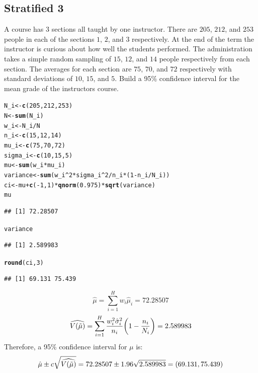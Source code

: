 \documentclass[oneside]{book}\usepackage[]{graphicx}\usepackage[dvipsnames,table,xcdraw]{xcolor}
\makeatletter
\newcommand{\hlnum}[1]{\textcolor[rgb]{0.686,0.059,0.569}{#1}}%
\newcommand{\hlopt}[1]{\textcolor[rgb]{0,0,0}{#1}}%
\newcommand{\hlstd}[1]{\textcolor[rgb]{0.345,0.345,0.345}{#1}}%
\newcommand{\hlkwb}[1]{\textcolor[rgb]{0.69,0.353,0.396}{#1}}%
\newcommand{\hlkwd}[1]{\textcolor[rgb]{0.737,0.353,0.396}{\textbf{#1}}}%
\newenvironment{kframe}{%
 \def\at@end@of@kframe{}%
 \ifinner\ifhmode%
  \def\at@end@of@kframe{\end{minipage}}%
  \begin{minipage}{\columnwidth}%
 \fi\fi%
 \def\FrameCommand##1{\hskip\@totalleftmargin \hskip-\fboxsep
 \colorbox{shadecolor}{##1}\hskip-\fboxsep
     \hskip-\linewidth \hskip-\@totalleftmargin \hskip\columnwidth}%
 \MakeFramed {\advance\hsize-\width
   \@totalleftmargin\z@ \linewidth\hsize
   \@setminipage}}%
 {\par\unskip\endMakeFramed%
 \at@end@of@kframe}
\newenvironment{knitrout}{}{} %
\let\mathbb\relax
\makeatother
\begin{document}
\subsection{Stratified 3}
A course has 3 sections all taught by one instructor. There
are $205$, $212$, and $253$ people in each of the sections
$1$, $2$, and $3$ respectively. At the end of the term the instructor
is curious about how well the students performed. The administration
takes a simple random sampling of $15$, $12$, and $14$ people respectively from each section.
The averages for each section are $75$, $70$, and $72$ respectively
with standard deviations of $10$, $15$, and $5$. Build a 95\%
confidence interval for the mean grade of the instructors course.

\begin{knitrout}
\color{fgcolor}\begin{kframe}
\begin{alltt}
\hlstd{N_i} \hlkwb{<-} \hlkwd{c}\hlstd{(}\hlnum{205}\hlstd{,} \hlnum{212}\hlstd{,} \hlnum{253}\hlstd{)}
\hlstd{N} \hlkwb{<-} \hlkwd{sum}\hlstd{(N_i)}
\hlstd{w_i} \hlkwb{<-} \hlstd{N_i}\hlopt{/}\hlstd{N}
\hlstd{n_i} \hlkwb{<-} \hlkwd{c}\hlstd{(}\hlnum{15}\hlstd{,} \hlnum{12}\hlstd{,} \hlnum{14}\hlstd{)}
\hlstd{mu_i} \hlkwb{<-} \hlkwd{c}\hlstd{(}\hlnum{75}\hlstd{,} \hlnum{70}\hlstd{,} \hlnum{72}\hlstd{)}
\hlstd{sigma_i} \hlkwb{<-} \hlkwd{c}\hlstd{(}\hlnum{10}\hlstd{,} \hlnum{15}\hlstd{,} \hlnum{5}\hlstd{)}
\hlstd{mu} \hlkwb{<-} \hlkwd{sum}\hlstd{(w_i} \hlopt{*} \hlstd{mu_i)}
\hlstd{variance} \hlkwb{<-} \hlkwd{sum}\hlstd{(w_i}\hlopt{^}\hlnum{2} \hlopt{*} \hlstd{sigma_i}\hlopt{^}\hlnum{2}\hlopt{/}\hlstd{n_i} \hlopt{*} \hlstd{(}\hlnum{1} \hlopt{-} \hlstd{n_i}\hlopt{/}\hlstd{N_i))}
\hlstd{ci} \hlkwb{<-} \hlstd{mu} \hlopt{+} \hlkwd{c}\hlstd{(}\hlopt{-}\hlnum{1}\hlstd{,} \hlnum{1}\hlstd{)} \hlopt{*} \hlkwd{qnorm}\hlstd{(}\hlnum{0.975}\hlstd{)} \hlopt{*} \hlkwd{sqrt}\hlstd{(variance)}
\hlstd{mu}
\end{alltt}
\begin{verbatim}
## [1] 72.28507
\end{verbatim}
\begin{alltt}
\hlstd{variance}
\end{alltt}
\begin{verbatim}
## [1] 2.589983
\end{verbatim}
\begin{alltt}
\hlkwd{round}\hlstd{(ci,} \hlnum{3}\hlstd{)}
\end{alltt}
\begin{verbatim}
## [1] 69.131 75.439
\end{verbatim}
\end{kframe}
\end{knitrout}

\[ \hat{\mu}=\sum_{i=1}^H w_i \hat{\mu}_i=72.28507 \]
\[\widehat{\mathbb{V}(\tilde{\mu})}=\sum_{i=1}^{H} \frac{w_i^2\hat{\sigma}_i^2}{n_i}\biggl(1-\frac{n_i}{N_i} \biggr)=2.589983 \]
Therefore, a 95\% confidence interval for $\mu$ is:
\[\hat{\mu}\pm c\sqrt{\widehat{\mathbb{V}(\tilde{\mu})}}=72.28507\pm 1.96\sqrt{2.589983}=(69.131,75.439) \]




\end{document}
